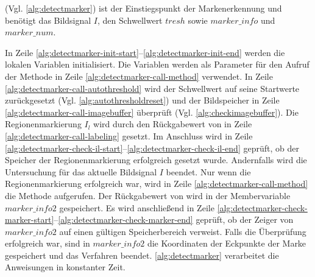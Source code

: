  (Vgl. \autoref{alg:detectmarker}) ist der Einstiegspunkt der Markenerkennung und benötigt das
 Bildsignal $I$, den Schwellwert $\mathit{tresh}$ sowie $\mathit{marker\_info}$ und $\mathit{marker\_num}$.

In Zeile \ref{alg:detectmarker-init-start}--\ref{alg:detectmarker-init-end} werden die lokalen Variablen initialisiert.
 Die Variablen werden als Parameter für den Aufruf der Methode  in Zeile
 \ref{alg:detectmarker-call-method} verwendet. In Zeile \ref{alg:detectmarker-call-autothreshold} wird der Schwellwert
 auf seine Startwerte zurückgesetzt (Vgl. \autoref{alg:autothresholdreset}) und der Bildspeicher in Zeile
 \ref{alg:detectmarker-call-imagebuffer} überprüft (Vgl. \autoref{alg:checkimagebuffer}). Die Regionenmarkierung $I_l$
 wird durch den Rückgabewert von  in Zeile \ref{alg:detectmarker-call-labeling} gesetzt. Im
 Anschluss wird in Zeile \ref{alg:detectmarker-check-il-start}--\ref{alg:detectmarker-check-il-end} geprüft, ob der
 Speicher der Regionenmarkierung erfolgreich gesetzt wurde. Andernfalls wird die Untersuchung für das aktuelle
 Bildsignal $I$ beendet. Nur wenn die Regionenmarkierung erfolgreich war, wird in Zeile
 \ref{alg:detectmarker-call-method} die Methode  aufgerufen. Der Rückgabewert von
  wird in der Membervariable $\mathit{marker\_info2}$ gespeichert. Es wird anschließend in
 Zeile \ref{alg:detectmarker-check-marker-start}--\ref{alg:detectmarker-check-marker-end} geprüft, ob der Zeiger von
 $\mathit{marker\_info2}$ auf einen gültigen Speicherbereich verweist. Falls die Überprüfung erfolgreich war, sind in
 $\mathit{marker\_info2}$ die Koordinaten der Eckpunkte der Marke gespeichert und das Verfahren beendet.
 \autoref{alg:detectmarker} verarbeitet die Anweisungen in konstanter Zeit.



\clearpage



\clearpage
